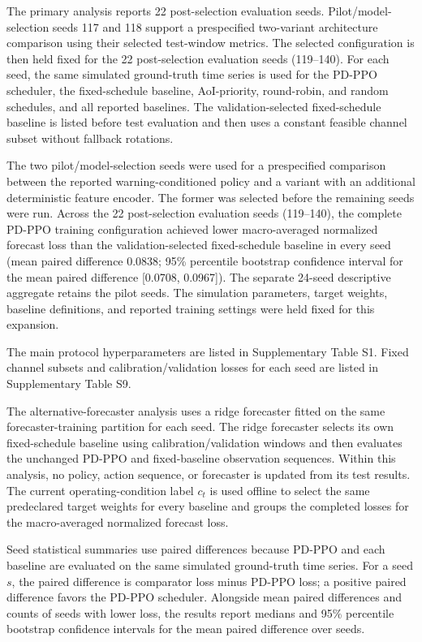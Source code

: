 The primary analysis reports 22 post-selection evaluation seeds. Pilot/model-selection seeds 117 and 118 support
a prespecified two-variant architecture comparison using their selected
test-window metrics. The selected configuration is then held fixed for the 22
post-selection evaluation seeds (119--140).
For each seed, the same simulated ground-truth time series is used for the
PD-PPO scheduler, the fixed-schedule baseline,
AoI-priority, round-robin, and random schedules, and all reported baselines. The
validation-selected fixed-schedule baseline is listed before test
evaluation and then uses a constant feasible channel subset without fallback
rotations.

The two pilot/model-selection seeds were used for a prespecified comparison between the
reported warning-conditioned policy and a variant with an additional deterministic
feature encoder. The former was selected before the remaining seeds were run.
Across the 22 post-selection evaluation seeds (119--140), the complete PD-PPO training
configuration achieved lower macro-averaged normalized forecast loss than the
validation-selected fixed-schedule baseline in every seed (mean paired difference 0.0838;
95\% percentile bootstrap confidence interval for the mean paired difference
[0.0708, 0.0967]). The separate 24-seed descriptive aggregate retains the pilot
seeds. The simulation parameters, target weights, baseline
definitions, and reported training settings were held fixed for this expansion.

The main protocol hyperparameters are listed in Supplementary Table S1.
Fixed channel subsets and calibration/validation losses for each seed are listed in
Supplementary Table S9.

The alternative-forecaster analysis uses a ridge forecaster fitted on the same
forecaster-training partition for each seed. The ridge forecaster selects its own
fixed-schedule baseline using calibration/validation windows and then evaluates the unchanged
PD-PPO and fixed-baseline observation sequences. Within this analysis, no policy,
action sequence, or forecaster is updated from its test results. The current
operating-condition label $c_t$ is used offline to select the same
predeclared target weights for every baseline and groups the completed losses for the
macro-averaged normalized forecast loss.

Seed statistical summaries use paired differences because PD-PPO and each baseline
are evaluated on the same simulated ground-truth time series. For a
seed $s$, the paired difference is comparator loss minus PD-PPO loss; a positive
paired difference favors the PD-PPO scheduler. Alongside mean paired differences
and counts of seeds with lower loss, the results report medians and 95\%
percentile bootstrap confidence intervals for the mean paired difference over
seeds.

